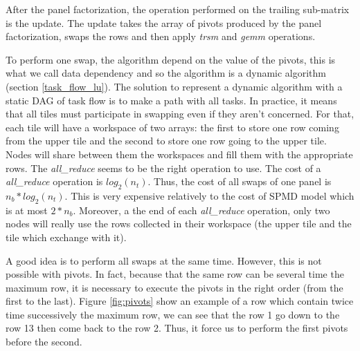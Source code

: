 After the panel factorization, the operation performed on the trailing sub-matrix is the update. The update takes the array of pivots produced by the panel factorization, swaps the rows and then apply \textit{trsm} and \textit{gemm} operations.

To perform one swap, the algorithm depend on the value of the pivots, this is what we call data dependency and so the algorithm is a dynamic algorithm (section \ref{task_flow_lu}). The solution to represent a dynamic algorithm with a static DAG of task flow is to make a path with all tasks. In practice, it means that all tiles must participate in swapping even if they aren't concerned.
For that, each tile will have a workspace of two arrays: the first to store one row coming from the upper tile and the second to store one row going to the upper tile. Nodes will share between them the workspaces and fill them with the appropriate rows.
The \textit{all\_reduce} seems to be the right operation to use. The cost of a \textit{all\_reduce} operation is $log_2(n_t)$. Thus, the cost of all swaps of one panel is $n_b*log_2(n_t)$. This is very expensive relatively to the cost of SPMD model which is at most $2*n_b$.
Moreover, a the end of each \textit{all\_reduce} operation, only two nodes will really use the rows collected in their workspace (the upper tile and the tile which exchange with it).

A good idea is to perform all swaps at the same time. However, this is not possible with pivots. In fact, because that the same row can be several time the maximum row, it is necessary to execute the pivots in the right order (from the first to the last). Figure \ref{fig:pivots} show an example of a row which contain twice time successively the maximum row, we can see that the row 1 go down to the row 13 then come back to the row 2. Thus, it force us to perform the first pivots before the second.

